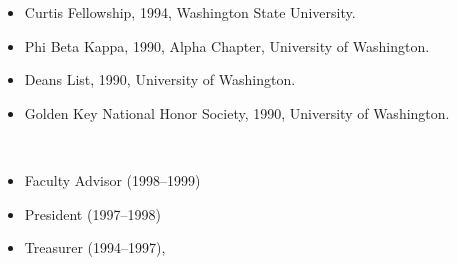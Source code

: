 \documentclass[12pt]{article}
\begin{document}
\vspace{0.25cm}



\begin{itemize}
\item Curtis Fellowship, 1994, Washington State University.
\item Phi Beta Kappa, 1990, Alpha Chapter, University of Washington.
\item Deans List, 1990, University of Washington.
\item Golden Key National Honor Society, 1990, University of Washington.
\end{itemize}



\\

\begin{itemize}
\item Faculty Advisor (1998--1999)
\item President (1997--1998) 
\item Treasurer (1994--1997),
\end{itemize}

\\

%
\end{document}
